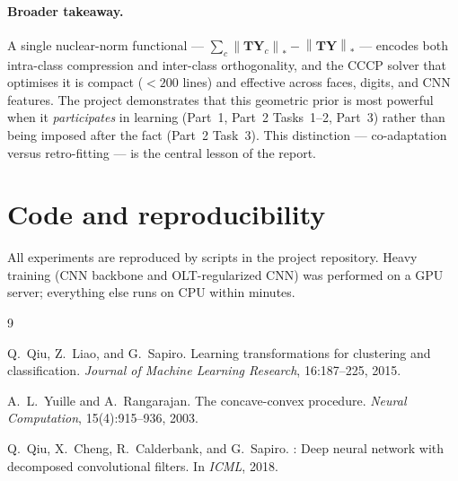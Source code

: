\documentclass[10pt]{article}
\newcommand{\T}{\mathbf{T}}
\newcommand{\Y}{\mathbf{Y}}
\newcommand{\nuc}[1]{\left\|#1\right\|_{\ast}}
\begin{document}
\paragraph{Broader takeaway.}
A single nuclear-norm functional --- $\sum_c\nuc{\T\Y_c}-\nuc{\T\Y}$
--- encodes both intra-class compression and inter-class orthogonality,
and the CCCP solver that optimises it is compact ($<\!200$ lines) and
effective across faces, digits, and CNN features. The project
demonstrates that this geometric prior is most powerful when it
\emph{participates} in learning (Part~1, Part~2 Tasks~1--2, Part~3)
rather than being imposed after the fact (Part~2 Task~3). This
distinction --- co-adaptation versus retro-fitting --- is the central
lesson of the report.

\section*{Code and reproducibility}

All experiments are reproduced by scripts in
the project repository. Heavy training (CNN backbone and
OLT-regularized CNN) was performed on a GPU server; everything else
runs on CPU within minutes.

\begin{thebibliography}{9}

Q.~Qiu, Z.~Liao, and G.~Sapiro.
\newblock Learning transformations for clustering and classification.
\newblock \emph{Journal of Machine Learning Research}, 16:187--225, 2015.

A.~L.~Yuille and A.~Rangarajan.
\newblock The concave-convex procedure.
\newblock \emph{Neural Computation}, 15(4):915--936, 2003.

Q.~Qiu, X.~Cheng, R.~Calderbank, and G.~Sapiro.
: Deep neural network with decomposed convolutional filters.
\newblock In \emph{ICML}, 2018.

\end{thebibliography}
\end{document}

